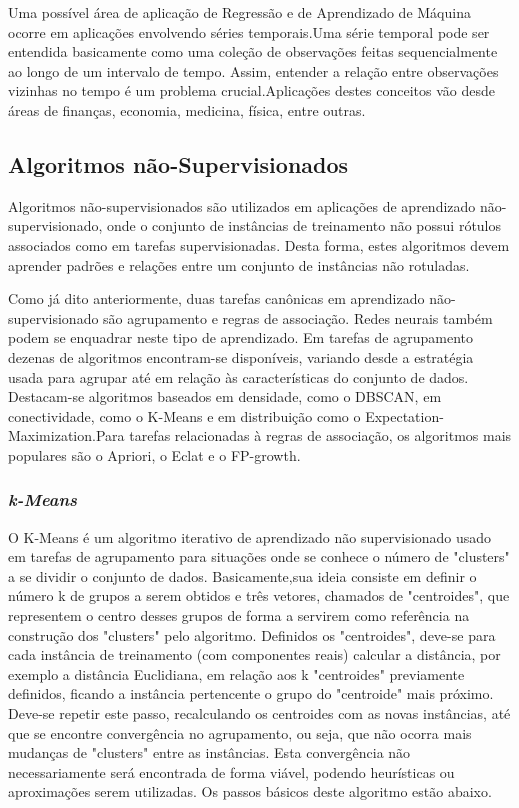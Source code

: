 \documentclass{article}
\begin{document}
Uma possível área de aplicação de Regressão e de Aprendizado de Máquina ocorre em aplicações envolvendo séries temporais.Uma série temporal pode ser entendida basicamente como uma coleção de observações feitas sequencialmente ao longo de um intervalo de tempo. Assim, entender a relação entre observações vizinhas no tempo é um problema crucial.Aplicações destes conceitos vão desde áreas de finanças, economia, medicina, física, entre outras.

\subsection{Algoritmos não-Supervisionados}

Algoritmos não-supervisionados são utilizados em aplicações de aprendizado não-supervisionado, onde o conjunto de instâncias de treinamento não possui rótulos associados como em tarefas supervisionadas. Desta forma, estes algoritmos devem aprender padrões e relações entre um conjunto de instâncias não rotuladas.

Como já dito anteriormente, duas tarefas canônicas em aprendizado não-supervisionado são agrupamento e regras de associação. Redes neurais também podem se enquadrar neste tipo de aprendizado. Em tarefas de agrupamento dezenas de algoritmos encontram-se disponíveis, variando desde a estratégia usada para agrupar até em relação às características do conjunto de dados. Destacam-se algoritmos baseados em densidade, como o DBSCAN, em conectividade, como o K-Means e em distribuição como o Expectation-Maximization.Para tarefas relacionadas à regras de associação, os algoritmos mais populares são o Apriori, o Eclat e o FP-growth.  

\subsubsection{{\b \it k-Means}}

O K-Means é um algoritmo iterativo de aprendizado não supervisionado usado em tarefas de agrupamento para situações onde se conhece o número de "clusters" a se dividir o conjunto de dados. Basicamente,sua ideia consiste em definir o número k de grupos a serem obtidos e três vetores, chamados de "centroides", que representem o centro desses grupos de forma a servirem como referência na construção dos "clusters" pelo algoritmo. Definidos os "centroides", deve-se para cada instância de treinamento (com componentes reais) calcular a distância, por exemplo a distância Euclidiana, em relação aos k "centroides" previamente definidos, ficando a instância pertencente o grupo do "centroide" mais próximo. Deve-se repetir este passo, recalculando os centroides com as novas instâncias, até que se encontre convergência no agrupamento, ou seja, que não ocorra mais mudanças de "clusters" entre as instâncias. Esta convergência não necessariamente será encontrada de forma viável, podendo heurísticas ou aproximações serem utilizadas. Os passos básicos deste algoritmo estão abaixo.
\end{document}
